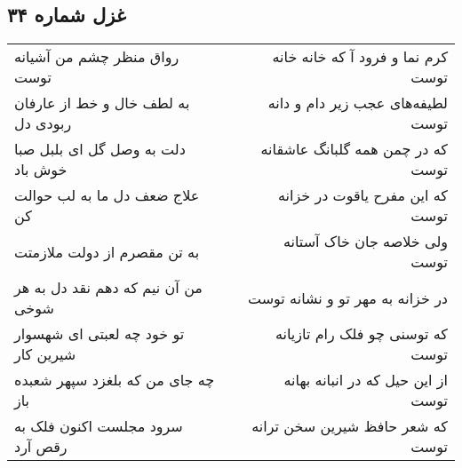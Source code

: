 \begin{center}
\section*{غزل شماره ۳۴}
\label{sec:sh034}
\begin{longtable}{l p{0.5cm} r}
رواق منظر چشم من آشیانه توست
&&
کرم نما و فرود آ که خانه خانه توست
\\
به لطف خال و خط از عارفان ربودی دل
&&
لطیفه‌های عجب زیر دام و دانه توست
\\
دلت به وصل گل ای بلبل صبا خوش باد
&&
که در چمن همه گلبانگ عاشقانه توست
\\
علاج ضعف دل ما به لب حوالت کن
&&
که این مفرح یاقوت در خزانه توست
\\
به تن مقصرم از دولت ملازمتت
&&
ولی خلاصه جان خاک آستانه توست
\\
من آن نیم که دهم نقد دل به هر شوخی
&&
در خزانه به مهر تو و نشانه توست
\\
تو خود چه لعبتی ای شهسوار شیرین کار
&&
که توسنی چو فلک رام تازیانه توست
\\
چه جای من که بلغزد سپهر شعبده باز
&&
از این حیل که در انبانه بهانه توست
\\
سرود مجلست اکنون فلک به رقص آرد
&&
که شعر حافظ شیرین سخن ترانه توست
\\
\end{longtable}
\end{center}
